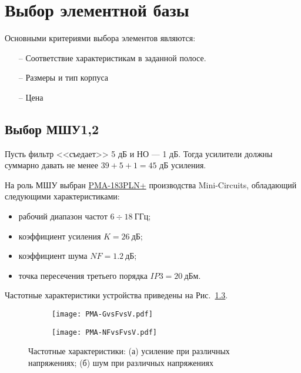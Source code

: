 \chapter{Выбор элементной базы} \label{chap:components-search}

Основными критериями выбора элементов являются:

\begin{itemize}
	\item[--] Соответствие характеристикам в заданной полосе.
	\item[--] Размеры и тип корпуса
	\item[--] Цена
\end{itemize}

\section{Выбор МШУ1,2}

Пусть фильтр <<съедает>> 5 дБ и НО --- 1 дБ. Тогда усилители должны суммарно давать 
не менее $39+5+1=45$ дБ усиления.

На роль МШУ выбран \href{https://www.minicircuits.com/WebStore/dashboard.html?model=PMA-183PLN\%2B}{PMA-183PLN+} производства Mini-Circuits, обладающий следующими характеристиками:
\begin{itemize}
	\item 
	рабочий диапазон частот $6 \div 18~\text{ГГц}$;
	\item
	коэффициент усиления $K = 26~\text{дБ}$;
	\item
	коэффициент шума $NF = 1.2~\text{дБ}$;
	\item
	точка пересечения третьего порядка $IP3 = 20~\text{дБм}$.
\end{itemize}

Частотные характеристики устройства приведены на Рис.~\ref{fig:LNA_responses}.

\begin{figure}[H]
	\centering
	\begin{subfigure}[b]{0.45\textwidth}
		\centering
		\texttt{[image: PMA-GvsFvsV.pdf]}
		\caption{}%
		\label{fig:LNA_gain}
	\end{subfigure}
	\hfill
	\begin{subfigure}[b]{0.45\textwidth}
		\centering
		\texttt{[image: PMA-NFvsFvsV.pdf]}
		\caption{}%
		\label{fig:LNA_NF}
	\end{subfigure}
	\caption{%
		Частотные характеристики:
		(а) усиление при различных напряжениях;
		(б) шум  при различных напряжениях
	}%
	\label{fig:LNA_responses}
\end{figure}


